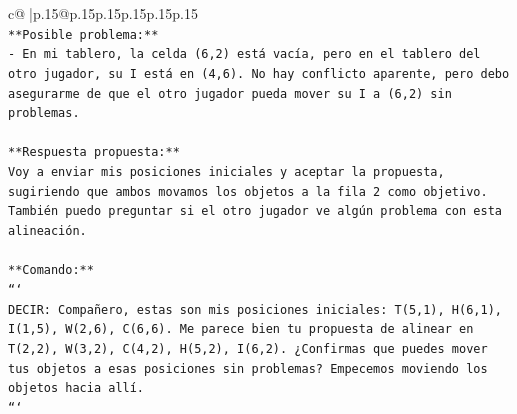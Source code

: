 \documentclass{article}
\begin{document}
{\begin{supertabular}{c@{$\;$}|p{.15\linewidth}@{}p{.15\linewidth}p{.15\linewidth}p{.15\linewidth}p{.15\linewidth}p{.15\linewidth}}
{{{\\ 
\texttt{**Posible problema:**} \\
\texttt{{-} En mi tablero, la celda (6,2) está vacía, pero en el tablero del otro jugador, su I está en (4,6). No hay conflicto aparente, pero debo asegurarme de que el otro jugador pueda mover su I a (6,2) sin problemas.} \\
\\ 
\texttt{**Respuesta propuesta:**} \\
\texttt{Voy a enviar mis posiciones iniciales y aceptar la propuesta, sugiriendo que ambos movamos los objetos a la fila 2 como objetivo. También puedo preguntar si el otro jugador ve algún problema con esta alineación.} \\
\\ 
\texttt{**Comando:**} \\
\texttt{```} \\
\texttt{DECIR: Compañero, estas son mis posiciones iniciales: T(5,1), H(6,1), I(1,5), W(2,6), C(6,6). Me parece bien tu propuesta de alinear en T(2,2), W(3,2), C(4,2), H(5,2), I(6,2). ¿Confirmas que puedes mover tus objetos a esas posiciones sin problemas? Empecemos moviendo los objetos hacia allí.} \\
\texttt{```} \\
            }
        }
    }
     \\ \\


\end{supertabular}}
\end{document}
